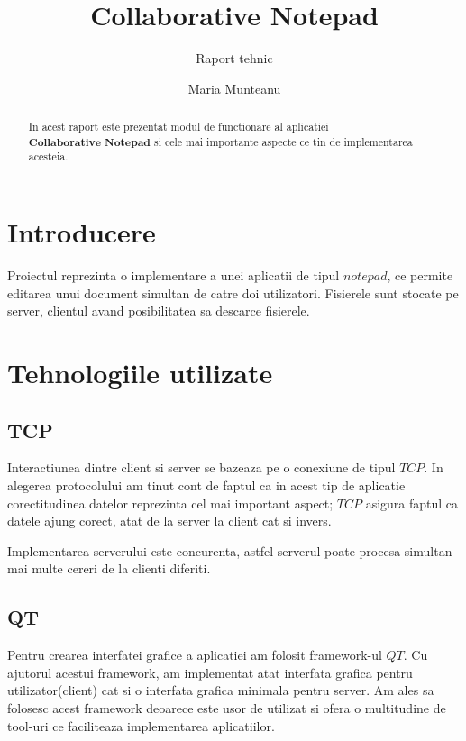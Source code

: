 \documentclass[runningheads]{llncs}
\begin{document}
%
\title{Collaborative Notepad}
\subtitle{Raport tehnic}

\author{Maria Munteanu} 

\maketitle             
%
\begin{abstract}
In acest raport este prezentat modul de functionare al aplicatiei $\textbf{Collaborative Notepad}$ si cele mai importante aspecte ce tin de implementarea acesteia.

\end{abstract}
%
%
%
\section{Introducere}

Proiectul reprezinta o implementare a unei aplicatii de tipul $\textit{notepad}$, ce permite editarea unui document simultan de catre doi utilizatori. Fisierele sunt stocate pe server, clientul avand posibilitatea sa descarce fisierele.

\section{Tehnologiile utilizate}

\subsection{TCP}

Interactiunea dintre client si server se bazeaza pe o conexiune de tipul $\textit{TCP}$. In alegerea protocolului am tinut cont de faptul ca in acest tip de aplicatie corectitudinea datelor reprezinta cel mai important aspect; $\textit{TCP}$ asigura faptul ca datele ajung corect, atat de la server la client cat si invers. 

Implementarea serverului este concurenta, astfel serverul poate procesa simultan mai multe cereri de la clienti diferiti.

\subsection{QT}

Pentru crearea interfatei grafice a aplicatiei am folosit framework-ul $\textit{QT}$. Cu ajutorul acestui framework, am implementat atat interfata grafica pentru utilizator(client) cat si o interfata grafica minimala pentru server. Am ales sa folosesc acest framework deoarece este usor de utilizat si ofera o multitudine de tool-uri ce faciliteaza implementarea aplicatiilor.
\end{document}
